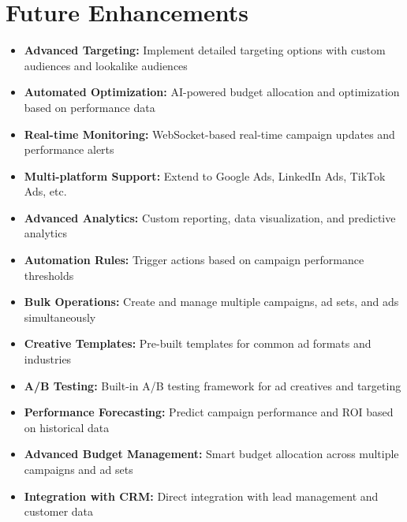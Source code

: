\documentclass[11pt,a4paper]{article}
\begin{document}
\section{Future Enhancements}
\begin{itemize}
  \item \textbf{Advanced Targeting:} Implement detailed targeting options with custom audiences and lookalike audiences
  \item \textbf{Automated Optimization:} AI-powered budget allocation and optimization based on performance data
  \item \textbf{Real-time Monitoring:} WebSocket-based real-time campaign updates and performance alerts
  \item \textbf{Multi-platform Support:} Extend to Google Ads, LinkedIn Ads, TikTok Ads, etc.
  \item \textbf{Advanced Analytics:} Custom reporting, data visualization, and predictive analytics
  \item \textbf{Automation Rules:} Trigger actions based on campaign performance thresholds
  \item \textbf{Bulk Operations:} Create and manage multiple campaigns, ad sets, and ads simultaneously
  \item \textbf{Creative Templates:} Pre-built templates for common ad formats and industries
  \item \textbf{A/B Testing:} Built-in A/B testing framework for ad creatives and targeting
  \item \textbf{Performance Forecasting:} Predict campaign performance and ROI based on historical data
  \item \textbf{Advanced Budget Management:} Smart budget allocation across multiple campaigns and ad sets
  \item \textbf{Integration with CRM:} Direct integration with lead management and customer data
\end{itemize}
\end{document}
